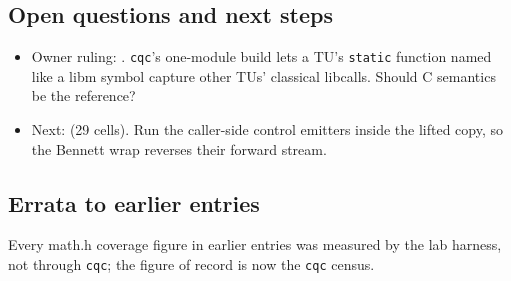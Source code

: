 \subsection*{Open questions and next steps}
\begin{itemize}
  \item Owner ruling: . \texttt{cqc}'s one-module build lets a TU's \texttt{static}
  function named like a libm symbol capture other TUs' classical libcalls. Should C semantics
  be the reference?
  \item Next:  (29 cells). Run the caller-side control emitters inside the lifted
  copy, so the Bennett wrap reverses their forward stream.
\end{itemize}

\subsection*{Errata to earlier entries}
Every math.h coverage figure in earlier entries was measured by the lab harness, not through
\texttt{cqc}; the figure of record is now the \texttt{cqc} census.
